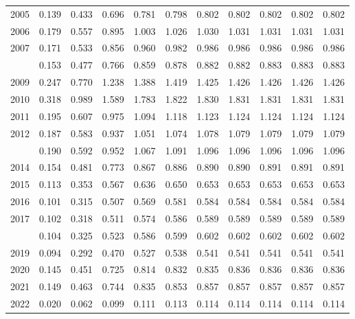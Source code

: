 \documentclass[
]{article}
\begin{document}
\begin{longtable}[t]{lrrrrrrrrrr}
2005 & 0.139 & 0.433 & 0.696 & 0.781 & 0.798 & 0.802 & 0.802 & 0.802 & 0.802 & 0.802\\
2006 & 0.179 & 0.557 & 0.895 & 1.003 & 1.026 & 1.030 & 1.031 & 1.031 & 1.031 & 1.031\\
2007 & 0.171 & 0.533 & 0.856 & 0.960 & 0.982 & 0.986 & 0.986 & 0.986 & 0.986 & 0.986\\
\addlinespace
2008 & 0.153 & 0.477 & 0.766 & 0.859 & 0.878 & 0.882 & 0.882 & 0.883 & 0.883 & 0.883\\
2009 & 0.247 & 0.770 & 1.238 & 1.388 & 1.419 & 1.425 & 1.426 & 1.426 & 1.426 & 1.426\\
2010 & 0.318 & 0.989 & 1.589 & 1.783 & 1.822 & 1.830 & 1.831 & 1.831 & 1.831 & 1.831\\
2011 & 0.195 & 0.607 & 0.975 & 1.094 & 1.118 & 1.123 & 1.124 & 1.124 & 1.124 & 1.124\\
2012 & 0.187 & 0.583 & 0.937 & 1.051 & 1.074 & 1.078 & 1.079 & 1.079 & 1.079 & 1.079\\
\addlinespace
2013 & 0.190 & 0.592 & 0.952 & 1.067 & 1.091 & 1.096 & 1.096 & 1.096 & 1.096 & 1.096\\
2014 & 0.154 & 0.481 & 0.773 & 0.867 & 0.886 & 0.890 & 0.890 & 0.891 & 0.891 & 0.891\\
2015 & 0.113 & 0.353 & 0.567 & 0.636 & 0.650 & 0.653 & 0.653 & 0.653 & 0.653 & 0.653\\
2016 & 0.101 & 0.315 & 0.507 & 0.569 & 0.581 & 0.584 & 0.584 & 0.584 & 0.584 & 0.584\\
2017 & 0.102 & 0.318 & 0.511 & 0.574 & 0.586 & 0.589 & 0.589 & 0.589 & 0.589 & 0.589\\
\addlinespace
2018 & 0.104 & 0.325 & 0.523 & 0.586 & 0.599 & 0.602 & 0.602 & 0.602 & 0.602 & 0.602\\
2019 & 0.094 & 0.292 & 0.470 & 0.527 & 0.538 & 0.541 & 0.541 & 0.541 & 0.541 & 0.541\\
2020 & 0.145 & 0.451 & 0.725 & 0.814 & 0.832 & 0.835 & 0.836 & 0.836 & 0.836 & 0.836\\
2021 & 0.149 & 0.463 & 0.744 & 0.835 & 0.853 & 0.857 & 0.857 & 0.857 & 0.857 & 0.857\\
2022 & 0.020 & 0.062 & 0.099 & 0.111 & 0.113 & 0.114 & 0.114 & 0.114 & 0.114 & 0.114\\*
\end{longtable}
\end{document}
